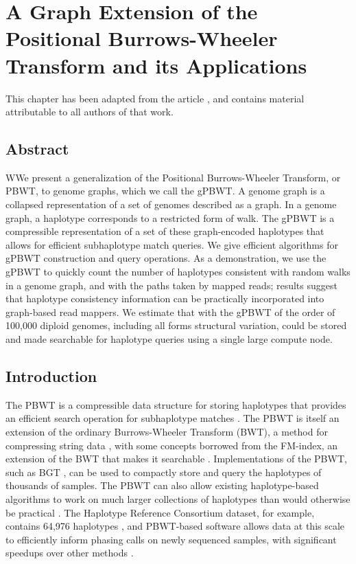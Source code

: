 \chapter{A Graph Extension of the Positional Burrows-Wheeler Transform and its Applications}
\label{ch:gpbwt}

This chapter has been adapted from the article \citet{novak2016graph}, and contains material attributable to all authors of that work.

\section{Abstract}
WWe present a generalization of the Positional Burrows-Wheeler Transform, or PBWT, to genome graphs, which we call the gPBWT. A genome graph is a collapsed representation of a set of genomes described as a graph. In a genome graph, a haplotype corresponds to a restricted form of walk. The gPBWT is a compressible representation of a set of these graph-encoded haplotypes that allows for efficient subhaplotype match queries. We give efficient algorithms for gPBWT construction and query operations.
As a demonstration, we use the gPBWT to quickly count the number of haplotypes consistent with random walks in a genome graph, and with the paths taken by mapped reads; results suggest that haplotype consistency information can be practically incorporated into graph-based read mappers. We estimate that with the gPBWT of the order of 100,000 diploid genomes, including all forms structural variation, could be stored and made searchable for haplotype queries using a single large compute node.

\section{Introduction}

The PBWT is a compressible data structure for storing haplotypes that provides an efficient search operation for subhaplotype matches \cite{durbin2014efficient}. The PBWT is itself an extension of the ordinary Burrows-Wheeler Transform (BWT), a method for compressing string data \cite{burrows1994block}, with some concepts borrowed from the FM-index, an extension of the BWT that makes it searchable \cite{ferragina2000opportunistic}. Implementations of the PBWT, such as BGT \cite{li2015bgt}, can be used to compactly store and query the haplotypes of thousands of samples. The PBWT can also allow existing haplotype-based algorithms to work on much larger collections of haplotypes than would otherwise be practical \cite{lunter2016fast}. The Haplotype Reference Consortium dataset, for example, contains 64,976 haplotypes \cite{mccarthy2016reference}, and PBWT-based software allows data at this scale to efficiently inform phasing calls on newly sequenced samples, with significant speedups over other methods \cite{loh2016reference}.

